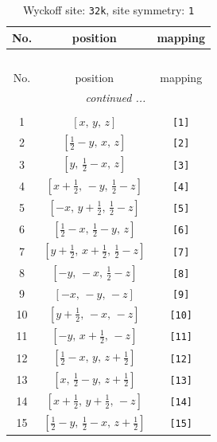 \documentclass[fleqn,8pt]{jsarticle}
\begin{document}
\renewcommand{\arraystretch}{1.2}
\begin{longtable}{ccc}
\caption{Wyckoff site: {\tt 32k}, site symmetry: {\tt 1}}
 \\
 \hline \hline
No. & position & mapping \\ \hline \endfirsthead

\multicolumn{2}{l}{\tablename\ \thetable{}} \\
 \hline \hline
No. & position & mapping \\ \hline \endhead

 \hline \hline
\multicolumn{2}{r}{\footnotesize\it continued ...} \\ \endfoot

 \hline \hline
\multicolumn{2}{r}{} \\ \endlastfoot

1 & $\left[ x,\, y,\, z \right]$ & {\tt [1]} \\ \hline
2 & $\left[ \frac{1}{2} - y,\, x,\, z \right]$ & {\tt [2]} \\ \hline
3 & $\left[ y,\, \frac{1}{2} - x,\, z \right]$ & {\tt [3]} \\ \hline
4 & $\left[ x + \frac{1}{2},\, - y,\, \frac{1}{2} - z \right]$ & {\tt [4]} \\ \hline
5 & $\left[ - x,\, y + \frac{1}{2},\, \frac{1}{2} - z \right]$ & {\tt [5]} \\ \hline
6 & $\left[ \frac{1}{2} - x,\, \frac{1}{2} - y,\, z \right]$ & {\tt [6]} \\ \hline
7 & $\left[ y + \frac{1}{2},\, x + \frac{1}{2},\, \frac{1}{2} - z \right]$ & {\tt [7]} \\ \hline
8 & $\left[ - y,\, - x,\, \frac{1}{2} - z \right]$ & {\tt [8]} \\ \hline
9 & $\left[ - x,\, - y,\, - z \right]$ & {\tt [9]} \\ \hline
10 & $\left[ y + \frac{1}{2},\, - x,\, - z \right]$ & {\tt [10]} \\ \hline
11 & $\left[ - y,\, x + \frac{1}{2},\, - z \right]$ & {\tt [11]} \\ \hline
12 & $\left[ \frac{1}{2} - x,\, y,\, z + \frac{1}{2} \right]$ & {\tt [12]} \\ \hline
13 & $\left[ x,\, \frac{1}{2} - y,\, z + \frac{1}{2} \right]$ & {\tt [13]} \\ \hline
14 & $\left[ x + \frac{1}{2},\, y + \frac{1}{2},\, - z \right]$ & {\tt [14]} \\ \hline
15 & $\left[ \frac{1}{2} - y,\, \frac{1}{2} - x,\, z + \frac{1}{2} \right]$ & {\tt [15]} \\ \hline

\end{longtable}
\end{document}
